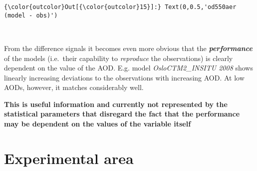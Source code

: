 \documentclass[11pt]{article}
\begin{document}
\begin{Verbatim}[commandchars=\\\{\}]
{\color{outcolor}Out[{\color{outcolor}15}]:} Text(0,0.5,'od550aer (model - obs)')
\end{Verbatim}
            
    \begin{center}
    \end{center}
    { \hspace*{\fill} \\}
    
    From the difference signals it becomes even more obvious that the
\textbf{\emph{performance}} of the models (i.e.~their capability to
\emph{reproduce} the observations) is clearly dependent on the value of
the AOD. E.g. model \emph{OsloCTM2\_INSITU 2008} shows linearly
increasing deviations to the observations with increasing AOD. At low
AODs, however, it matches considerably well.

\textbf{This is useful information and currently not represented by the
statistical parameters that disregard the fact that the performance may
be dependent on the values of the variable itself}

    \hypertarget{experimental-area}{%
\section{Experimental area}\label{experimental-area}}
\end{document}
